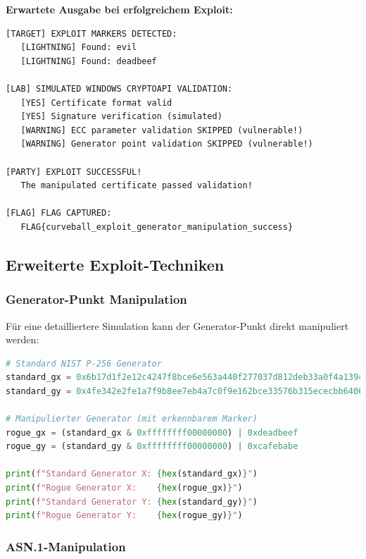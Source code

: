 \documentclass{article}
\begin{document}
\textbf{Erwartete Ausgabe bei erfolgreichem Exploit:}

\begin{lstlisting}[caption=Erfolgreiche Validation]
[TARGET] EXPLOIT MARKERS DETECTED:
   [LIGHTNING] Found: evil
   [LIGHTNING] Found: deadbeef

[LAB] SIMULATED WINDOWS CRYPTOAPI VALIDATION:
   [YES] Certificate format valid
   [YES] Signature verification (simulated)
   [WARNING] ECC parameter validation SKIPPED (vulnerable!)
   [WARNING] Generator point validation SKIPPED (vulnerable!)

[PARTY] EXPLOIT SUCCESSFUL!
   The manipulated certificate passed validation!

[FLAG] FLAG CAPTURED:
   FLAG{curveball_exploit_generator_manipulation_success}
\end{lstlisting}

\subsection{Erweiterte Exploit-Techniken}

\subsubsection{Generator-Punkt Manipulation}

Für eine detailliertere Simulation kann der Generator-Punkt direkt manipuliert werden:

\begin{lstlisting}[language=python, caption=Generator-Punkt Manipulation]
# Standard NIST P-256 Generator
standard_gx = 0x6b17d1f2e12c4247f8bce6e563a440f277037d812deb33a0f4a13945d898c296
standard_gy = 0x4fe342e2fe1a7f9b8ee7eb4a7c0f9e162bce33576b315ececbb6406837bf51f5

# Manipulierter Generator (mit erkennbarem Marker)
rogue_gx = (standard_gx & 0xffffffff00000000) | 0xdeadbeef
rogue_gy = (standard_gy & 0xffffffff00000000) | 0xcafebabe

print(f"Standard Generator X: {hex(standard_gx)}")
print(f"Rogue Generator X:    {hex(rogue_gx)}")
print(f"Standard Generator Y: {hex(standard_gy)}")
print(f"Rogue Generator Y:    {hex(rogue_gy)}")
\end{lstlisting}

\subsubsection{ASN.1-Manipulation}
\end{document}
